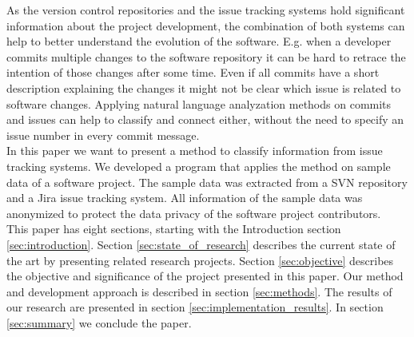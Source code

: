 As the version control repositories and the issue tracking systems hold significant information about the project development, the combination of both systems can help to better understand the evolution of the software. E.g. when a developer commits multiple changes to the software repository it can be hard to retrace the intention of those changes after some time. Even if all commits have a short description explaining the changes it might not be clear which issue is related to software changes. Applying natural language analyzation methods on commits and issues can help to classify and connect either, without the need to specify an issue number in every commit message.\\

In this paper we want to present a method to classify information from issue tracking systems. We developed a program that applies the method on sample data of a software project. The sample data was extracted from a SVN repository and a Jira issue tracking system. All information of the sample data was anonymized to protect the data privacy of the software project contributors.\\

This paper has eight sections, starting with the Introduction section \ref{sec:introduction}. Section \ref{sec:state_of_research} describes the current state of the art by presenting related research projects. Section \ref{sec:objective} describes the objective and significance of the project presented in this paper. Our method and development approach is described in section \ref{sec:methods}. The results of our research are presented in section \ref{sec:implementation_results}. In section \ref{sec:summary} we conclude the paper.